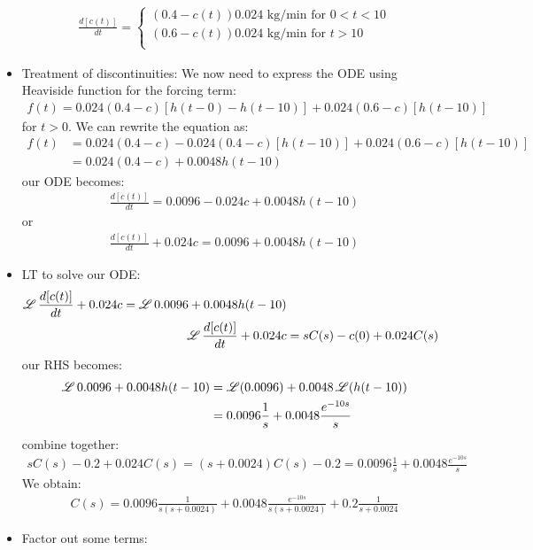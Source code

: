 \begin{exmp}{}
\begin{itemize}
 \begin{align*}
 \frac{d [ c(t)]}{dt}=
  \begin{cases}
 (0.4-c(t))0.024 \text{ kg/min for }0<t<10\\
  (0.6-c(t))0.024 \text{ kg/min for }t>10\\
 \end{cases}
 \end{align*}
\item Treatment of discontinuities:
We now need to express the ODE using Heaviside function for the forcing term:
 \begin{align*}
f(t)=0.024(0.4-c)[h(t-0)-h(t-10)] + 0.024(0.6-c)[h(t-10)]
 \end{align*}
 for $t>0$.
We can rewrite the equation as:
 \begin{align*}
f(t)&=0.024(0.4-c) - 0.024(0.4-c)[h(t-10)] + 0.024(0.6-c)[h(t-10)]\\
&=0.024(0.4-c)+0.0048h(t-10)
 \end{align*}
 our ODE becomes:
  \begin{align*}
\frac{d [ c(t)]}{dt}=0.0096-0.024c +0.0048h(t-10)
 \end{align*}
 or
  \begin{align*}
\frac{d [ c(t)]}{dt}+0.024c=0.0096 +0.0048h(t-10)
 \end{align*} 
\item LT to solve our ODE:
  \begin{align*}
\operatorname{\mathscr{L}}{\frac{d [ c(t)]}{dt}+0.024c}=\operatorname{\mathscr{L}}{0.0096 +0.0048h(t-10)}\\
\operatorname{\mathscr{L}}{\frac{d [ c(t)]}{dt}+0.024c}&=sC(s)-c(0)+0.024C(s)\\
 \end{align*} 
our RHS becomes:
  \begin{align*}
\operatorname{\mathscr{L}}{0.0096 +0.0048h(t-10)}&=\operatorname{\mathscr{L}}(0.0096)+0.0048\operatorname{\mathscr{L}}(h(t-10))\\
&=0.0096\frac{1}{s}+0.0048\frac{e^{-10s}}{s}
 \end{align*} 
 combine together:
  \begin{align*}
sC(s)-0.2+0.024C(s)=(s+0.0024)C(s)-0.2=0.0096\frac{1}{s}+0.0048\frac{e^{-10s}}{s}
 \end{align*} 
We obtain: 
  \begin{align*}
\boxed{C(s)=0.0096\frac{1}{s(s+0.0024)}+0.0048\frac{e^{-10s}}{s(s+0.0024)}+0.2\frac{1}{s+0.0024}}
 \end{align*} 
\item Factor out some terms:
  \begin{align*}

\end{align*}
\end{itemize}
\end{exmp}
